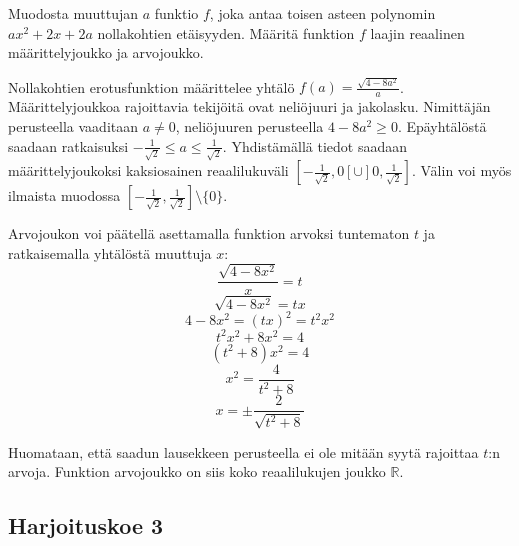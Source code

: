 \begin{tehtava}
	\begin{alakohdat}
	\end{alakohdat}
	\begin{vastaus}
		\begin{alakohdat}
	\end{alakohdat}
	\end{vastaus}
\end{tehtava}

\begin{tehtava}
Muodosta muuttujan $a$ funktio $f$, joka antaa toisen asteen polynomin $ax^2+2x+2a$ nollakohtien etäisyyden. Määritä funktion $f$ laajin reaalinen määrittelyjoukko ja arvojoukko.
	\begin{vastaus}
	Nollakohtien erotusfunktion määrittelee yhtälö $f(a)=\frac{\sqrt{4-8a^2}}{a}$. Määrittelyjoukkoa rajoittavia tekijöitä ovat neliöjuuri ja jakolasku. Nimittäjän perusteella vaaditaan $a\neq 0$, neliöjuuren perusteella $4-8a^2\geq 0$. Epäyhtälöstä saadaan ratkaisuksi $-\frac{1}{\sqrt{2}}\leq a \leq \frac{1}{\sqrt{2}}$. Yhdistämällä tiedot saadaan määrittelyjoukoksi kaksiosainen reaalilukuväli $[-\frac{1}{\sqrt{2}},0[\cup ]0,\frac{1}{\sqrt{2}}]$. Välin voi myös ilmaista muodossa $[-\frac{1}{\sqrt{2}},\frac{1}{\sqrt{2}}] \setminus \lbrace 0 \rbrace$.
	
Arvojoukon voi päätellä asettamalla funktion arvoksi tuntematon $t$ ja ratkaisemalla yhtälöstä muuttuja $x$:
	$$\frac{\sqrt{4-8x^2}}{x}=t$$
	$$\sqrt{4-8x^2}=tx$$
	$$4-8x^2=(tx)^2=t^2x^2$$
	$$t^2x^2+8x^2=4$$
	$$(t^2+8)x^2=4$$
	$$x^2=\frac{4}{t^2+8}$$
	$$x=\pm \frac{2}{\sqrt{t^2+8}}$$
	
	Huomataan, että saadun lausekkeen perusteella ei ole mitään syytä rajoittaa $t$:n arvoja. Funktion arvojoukko on siis koko reaalilukujen joukko $\mathbb{R}$.
	\end{vastaus}
\end{tehtava}

\subsection*{Harjoituskoe 3}

